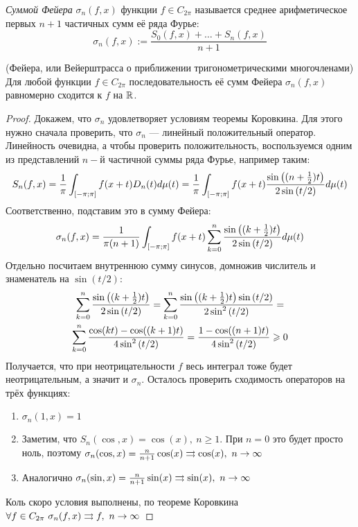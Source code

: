 \begin{definition}
	\textit{Суммой Фейера} $\sigma_n(f, x)$ функции $f \in C_{2\pi}$ называется среднее арифметическое первых $n+1$ частичных сумм её ряда Фурье:
	\[
		\sigma_n(f, x) := \frac{S_0(f, x) + \ldots + S_n(f, x)}{n + 1}
	\]
\end{definition}

\begin{theorem} (Фейера, или Вейерштрасса о приближении тригонометрическими многочленами)
	Для любой функции $f \in C_{2\pi}$ последовательность её сумм Фейера $\sigma_n(f, x)$ равномерно сходится к $f$ на $\mathbb{R}$.
\end{theorem}

\begin{proof}
	Докажем, что $\sigma_n$ удовлетворяет условиям теоремы Коровкина. Для этого нужно сначала проверить, что $\sigma_n$ --- линейный положительный оператор. Линейность очевидна, а чтобы проверить положительность, воспользуемся одним из представлений $n-$й частичной суммы ряда Фурье, например таким:
	\[
		S_n(f, x) = \frac{1}{\pi}\int_{[-\pi; \pi]} f(x + t)D_n(t)d\mu(t) = \frac{1}{\pi}\int_{[-\pi; \pi]} f(x + t) \frac{\sin\left((n + \frac{1}{2})t\right)}{2\sin\left(t/2\right)} d\mu(t)
	\]
	Соответственно, подставим это в сумму Фейера:
	\[
		\sigma_n(f, x) = \frac{1}{\pi(n+1)}\int_{[-\pi; \pi]} f(x + t) \sum_{k=0}^n \frac{\sin\left((k + \frac{1}{2})t\right)}{2\sin\left(t/2\right)} d\mu(t)
	\]
	Отдельно посчитаем внутреннюю сумму синусов, домножив числитель и знаменатель на $\sin(t/2)$:
	\begin{multline*}
		\sum_{k=0}^n \frac{\sin\left((k + \frac{1}{2})t\right)}{2\sin\left(t/2\right)} = \sum_{k=0}^n \frac{\sin\left((k + \frac{1}{2})t\right) \sin\left(t/2\right)}{2\sin^2\left(t/2\right)} = \\
		\sum_{k=0}^n \frac{\cos(kt) - \cos((k+1)t)}{4\sin^2\left(t/2\right)} = \frac{1 - \cos((n+1)t)}{4\sin^2\left(t/2\right)} \geqslant 0
	\end{multline*}
	Получается, что при неотрицательности $f$ весь интеграл тоже будет неотрицательным, а значит и $\sigma_n$. Осталось проверить сходимость операторов на трёх функциях:
	\begin{enumerate}
		\item $\sigma_n(1, x) = 1$
		
		\item Заметим, что $S_n(\cos, x) = \cos(x),\ n \ge 1$. При $n = 0$ это будет просто ноль, поэтому $\sigma_n(\cos, x) = \frac{n}{n + 1}\cos(x) \rightrightarrows \cos(x),\ n \to \infty$
		
		\item Аналогично $\sigma_n(\sin, x) = \frac{n}{n + 1}\sin(x) \rightrightarrows \sin(x),\ n \to \infty$ 
	\end{enumerate}
	Коль скоро условия выполнены, по теореме Коровкина $\forall f \in C_{2\pi}\ \sigma_n(f, x) \rightrightarrows f,\ n \to \infty$
\end{proof}

